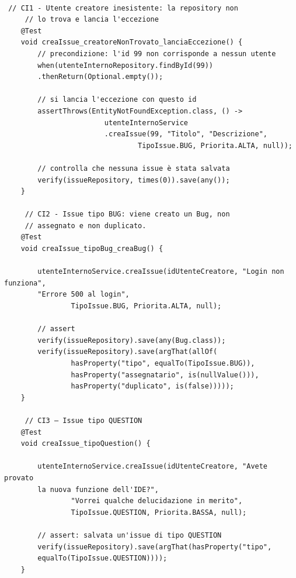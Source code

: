 \clearpage

\begin{listing}[!ht]
\begin{verbatim}

 // CI1 - Utente creatore inesistente: la repository non 
     // lo trova e lancia l'eccezione
    @Test
    void creaIssue_creatoreNonTrovato_lanciaEccezione() {
        // precondizione: l'id 99 non corrisponde a nessun utente
        when(utenteInternoRepository.findById(99))
        .thenReturn(Optional.empty());

        // si lancia l'eccezione con questo id
        assertThrows(EntityNotFoundException.class, () ->
                        utenteInternoService
                        .creaIssue(99, "Titolo", "Descrizione",
                                TipoIssue.BUG, Priorita.ALTA, null));

        // controlla che nessuna issue è stata salvata
        verify(issueRepository, times(0)).save(any());
    }

     // CI2 - Issue tipo BUG: viene creato un Bug, non 
     // assegnato e non duplicato.
    @Test
    void creaIssue_tipoBug_creaBug() {

        utenteInternoService.creaIssue(idUtenteCreatore, "Login non funziona", 
        "Errore 500 al login",
                TipoIssue.BUG, Priorita.ALTA, null);

        // assert
        verify(issueRepository).save(any(Bug.class));
        verify(issueRepository).save(argThat(allOf(
                hasProperty("tipo", equalTo(TipoIssue.BUG)),
                hasProperty("assegnatario", is(nullValue())),
                hasProperty("duplicato", is(false)))));
    }

     // CI3 — Issue tipo QUESTION
    @Test
    void creaIssue_tipoQuestion() {

        utenteInternoService.creaIssue(idUtenteCreatore, "Avete provato 
        la nuova funzione dell'IDE?",
                "Vorrei qualche delucidazione in merito",
                TipoIssue.QUESTION, Priorita.BASSA, null);

        // assert: salvata un'issue di tipo QUESTION
        verify(issueRepository).save(argThat(hasProperty("tipo", 
        equalTo(TipoIssue.QUESTION))));
    }

\end{verbatim}
\end{listing}

\clearpage


